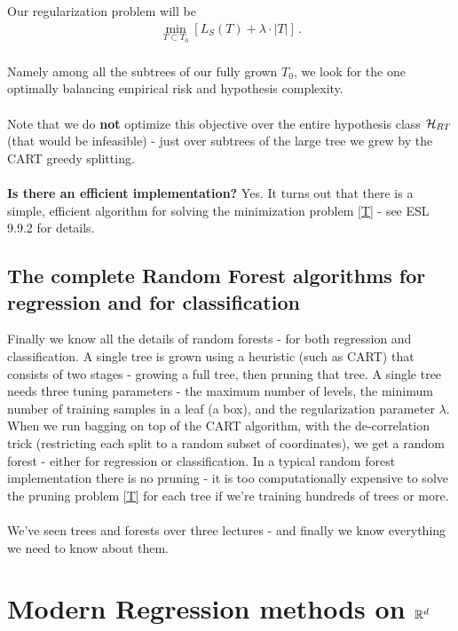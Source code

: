     Our regularization problem will be
    \begin{eqnarray} \label{T}
      \min_{T\subset T_0} \left[L_S(T) + \lambda\cdot |T|\right]\,.
    \end{eqnarray}
~\\
Namely among all the subtrees of our fully grown $T_0$, we look for the
      one optimally balancing empirical risk and hypothesis complexity.
\\~\\
Note that we do {\bf not} optimize this objective over the entire hypothesis
      class $\mathcal{H}_{RT}$ (that would be infeasible) - just over subtrees of the large tree we grew by the CART 
      greedy splitting. 
\\~\\
      {\bf Is there an efficient implementation?} Yes. It turns out that there
      is a simple, efficient algorithm for solving the minimization problem
      \eqref{T} - see ESL 9.9.2 for details. 

    \subsection{The complete Random Forest algorithms for regression and for
    classification}

    Finally we know all the details  of random forests - for both regression and
    classification. A single tree is grown using a heuristic (such as CART) that
    consists of two stages - growing a full tree, then pruning that tree. A
    single tree needs three tuning parameters - the maximum number of levels,
    the minimum number of training samples in a leaf (a box), and the
    regularization parameter $\lambda$. When we run bagging on top of the CART
    algorithm, with the de-correlation trick (restricting each split to a random
    subset of coordinates), we get a random forest - either for regression or
    classification. In a typical random forest implementation there is no
    pruning - it is too computationally expensive to solve the pruning 
    problem \eqref{T} for each tree if we're training hundreds of trees or more.
\\~\\
    We've seen trees and forests over three lectures - and finally we know
everything we need to know about them.


\section{Modern Regression methods on $\mathbb{R}^d$}


